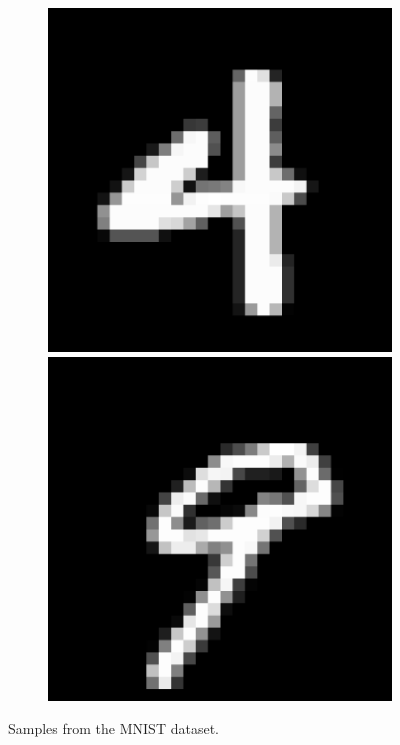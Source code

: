\begin{figure}[H]
\begin{subfigure}[b]{2cm}
    \vspace{0.15cm}
    \end{subfigure}%
    \hspace{0.0075\textwidth}
    \begin{subfigure}[b]{2cm}
    \includegraphics[width =\textwidth]{figs/MNIST/mnist_4.pdf}
    \vspace{-1.07\baselineskip}\\[1ex]
    \includegraphics[width =\textwidth]{figs/MNIST/mnist_9.pdf}
    \vspace{0.15cm}
    \end{subfigure}%
    \caption{Samples from the MNIST dataset.}
    \label{fig:datasets_mnist}
\end{figure}



